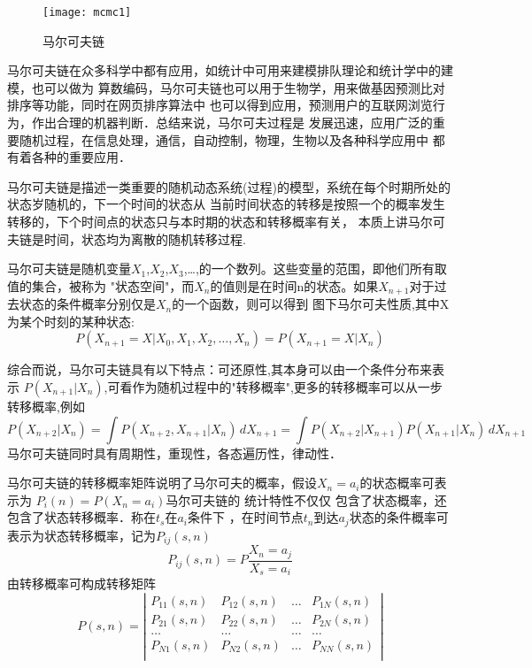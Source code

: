     \begin{figure}[htbp]
    \centering
    \texttt{[image: mcmc1]}
    \caption{马尔可夫链}\label{fig:mcmc1}
    \vspace{\baselineskip}
    \end{figure}
    马尔可夫链在众多科学中都有应用，如统计中可用来建模排队理论和统计学中的建模，也可以做为
算数编码，马尔可夫链也可以用于生物学，用来做基因预测比对排序等功能，同时在网页排序算法中
也可以得到应用，预测用户的互联网浏览行为，作出合理的机器判断．总结来说，马尔可夫过程是
发展迅速，应用广泛的重要随机过程，在信息处理，通信，自动控制，物理，生物以及各种科学应用中
都有着各种的重要应用．

  马尔可夫链是描述一类重要的随机动态系统(过程)的模型，系统在每个时期所处的状态岁随机的，下一个时间的状态从
当前时间状态的转移是按照一个的概率发生转移的，下个时间点的状态只与本时期的状态和转移概率有关，
本质上讲马尔可夫链是时间，状态均为离散的随机转移过程.

马尔可夫链是随机变量$X_1$,$X_2$,$X_3$,\ldots,的一个数列。这些变量的范围，即他们所有取值的集合，被称为
"状态空间"，而$X_n$的值则是在时间n的状态。如果$X_{n+1}$对于过去状态的条件概率分别仅是$X_n$的一个函数，则可以得到
图下马尔可夫性质,其中X为某个时刻的某种状态: $$P(X_{n+1} = X|X_0,X_1,X_2,\ldots,X_n)=P(X_{n+1} = X|X_n) $$
    
    综合而说，马尔可夫链具有以下特点：可还原性,其本身可以由一个条件分布来表示
$ P(X_{n+1}|X_{n})$,可看作为随机过程中的"转移概率",更多的转移概率可以从一步转移概率,例如
\[ P(X_{n+2}|X_n) =  \int P(X_{n+2},X_{n+1}|X_n) \,dX_{n+1} = \int P(X_{n+2}|X_{n+1}) P(X_{n+1}|X_n) \,dX_{n+1}\]  
马尔可夫链同时具有周期性，重现性，各态遍历性，律动性．

    马尔可夫链的转移概率矩阵说明了马尔可夫的概率，假设$X_n=a_i$的状态概率可表示为 $P_i(n)=P(X_n=a_i)$马尔可夫链的
统计特性不仅仅 包含了状态概率，还包含了状态转移概率．称在$t_s$在$a_i$条件下
，在时间节点$t_n$到达$a_j$状态的条件概率可表示为状态转移概率，记为$P_{ij}(s,n)$
    \[ P_{ij}(s,n)=P{\frac{X_n=a_j}{X_s=a_i}} \]  
    由转移概率可构成转移矩阵
    \[ P(s,n) = \left | \begin{array}{cccc}
        P_{11}(s,n) & P_{12}(s,n)  & \ldots &P_{1N}(s,n) \\
        P_{21}(s,n) & P_{22}(s,n)  & \ldots &P_{2N}(s,n) \\
        \ldots      & \ldots      & \ldots & \ldots    \\
        P_{N1}(s,n) & P_{N2}(s,n)  & \ldots &P_{NN}(s,n) \\
        \end{array} \right| \]

